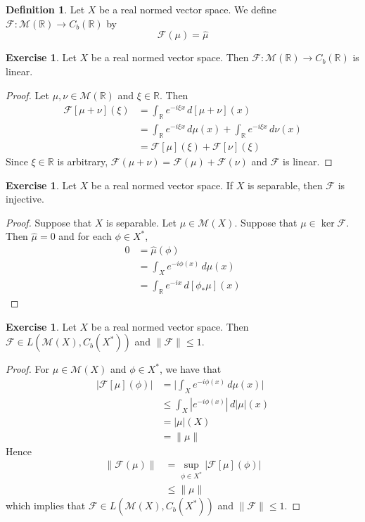 \documentclass[12pt]{amsart}
\theoremstyle{definition}
\newtheorem{defn}[definition]{Definition}
\newtheorem{ex}[definition]{Exercise}
\newcommand{\R}{\mathbb{R}}
\newcommand{\MF}{\mathcal{F}}
\newcommand{\MM}{\mathcal{M}}
\newcommand{\dmu}{\, d \mu}
\newcommand{\dnu}{\, d \nu}
\begin{document}
	\begin{defn}
		Let $X$ be a real normed vector space. We define $\MF: \MM(\R) \rightarrow C_b(\R)$ by $$\MF(\mu) = \hat{\mu}$$
	\end{defn}
	
	\begin{ex}
		Let $X$ be a real normed vector space. Then $\MF: \MM(\R) \rightarrow C_b(\R)$ is linear.
	\end{ex}
	
	\begin{proof}
		Let $\mu, \nu \in \MM(\R)$ and $\xi \in \R$. Then 
		\begin{align*}
			\MF[\mu + \nu](\xi) 
			& = \int_{\R} e^{-i \xi x} \, d[\mu + \nu](x) \\
			& = \int_{\R} e^{-i \xi x} \dmu(x) + \int_{\R} e^{-i \xi x} \dnu(x) \\
			& = \MF[\mu](\xi) + \MF[\nu](\xi) 
		\end{align*}
		Since $\xi \in \R$ is arbitrary, $\MF(\mu + \nu) = \MF(\mu) + \MF(\nu)$ and $\MF$ is linear.
	\end{proof}
	
	\begin{ex}
		Let $X$ be a real normed vector space. If $X$ is separable, then $\MF$ is injective.  
	\end{ex}
	
	\begin{proof}
		Suppose that $X$ is separable. Let $\mu \in \MM(X)$. Suppose that $\mu \in \ker \MF$. Then $\hat{\mu} =0$ and for each $\phi \in X^*$, 
		\begin{align*}
			0 
			& = \hat{\mu}(\phi) \\
			& = \int_X e^{-i \phi(x)} \dmu(x) \\
			& = \int_{\R} e^{-ix} \, d[\phi_*\mu](x)
		\end{align*}
	\end{proof}
	
	\begin{ex}
		Let $X$ be a real normed vector space. Then $\MF \in L(\MM(X), C_b(X^*))$ and $\|\MF\| \leq 1$.
	\end{ex}
	
	\begin{proof}
		For $\mu \in \MM(X)$ and $\phi \in X^*$, we have that 
		\begin{align*}
			|\MF[\mu](\phi)|
			& =  \bigg| \int_X e^{-i \phi(x)} \dmu(x) \bigg| \\
			& \leq \int_X |e^{-i \phi(x)}| \, d|\mu|(x) \\
			& = |\mu|(X) \\
			& = \|\mu\|
		\end{align*}
		Hence 
		\begin{align*}
			\|\MF(\mu)\| 
			& = \sup_{\phi \in X^*} |\MF[\mu](\phi)| \\
			& \leq \|\mu\|
		\end{align*}
		which implies that $\MF \in L(\MM(X), C_b(X^*))$ and $\|\MF\| \leq 1$.
	\end{proof}
	
\end{document}
